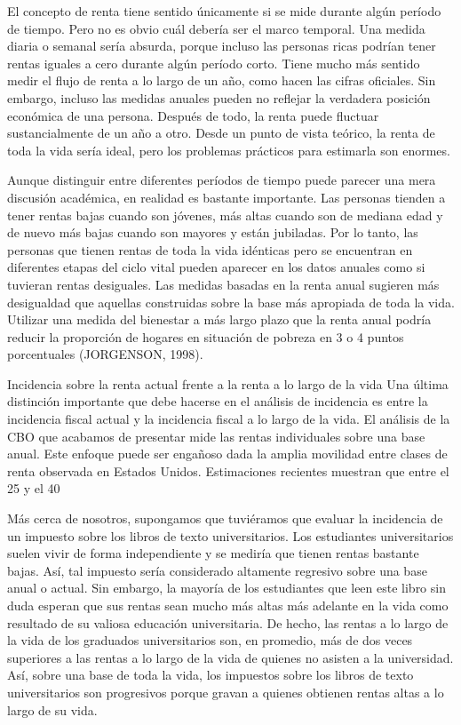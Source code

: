 \documentclass[10pt,a4paper]{article}
\begin{document}
{El concepto de renta tiene sentido únicamente si se mide durante algún período de tiempo. Pero no es obvio cuál debería ser el marco temporal. Una medida diaria o semanal sería absurda, porque incluso las personas ricas podrían tener rentas iguales a cero durante algún período corto. Tiene mucho más sentido medir el flujo de renta a lo largo de un año, como hacen las cifras oficiales. Sin embargo, incluso las medidas anuales pueden no reflejar la verdadera posición económica de una persona. Después de todo, la renta puede fluctuar sustancialmente de un año a otro. Desde un punto de vista teórico, la renta de toda la vida sería ideal, pero los problemas prácticos para estimarla son enormes.

Aunque distinguir entre diferentes períodos de tiempo puede parecer una mera discusión académica, en realidad es bastante importante. Las personas tienden a tener rentas bajas cuando son jóvenes, más altas cuando son de mediana edad y de nuevo más bajas cuando son mayores y están jubiladas. Por lo tanto, las personas que tienen rentas de toda la vida idénticas pero se encuentran en diferentes etapas del ciclo vital pueden aparecer en los datos anuales como si tuvieran rentas desiguales. Las medidas basadas en la renta anual sugieren más desigualdad que aquellas construidas sobre la base más apropiada de toda la vida. Utilizar una medida del bienestar a más largo plazo que la renta anual podría reducir la proporción de hogares en situación de pobreza en 3 o 4 puntos porcentuales (JORGENSON, 1998).

Incidencia sobre la renta actual frente a la renta a lo largo de la vida
Una última distinción importante que debe hacerse en el análisis de incidencia es entre la incidencia fiscal actual y la incidencia fiscal a lo largo de la vida. El análisis de la CBO que acabamos de presentar mide las rentas individuales sobre una base anual. Este enfoque puede ser engañoso dada la amplia movilidad entre clases de renta observada en Estados Unidos. Estimaciones recientes muestran que entre el 25 y el 40 %

Más cerca de nosotros, supongamos que tuviéramos que evaluar la incidencia de un impuesto sobre los libros de texto universitarios. Los estudiantes universitarios suelen vivir de forma independiente y se mediría que tienen rentas bastante bajas. Así, tal impuesto sería considerado altamente regresivo sobre una base anual o actual. Sin embargo, la mayoría de los estudiantes que leen este libro sin duda esperan que sus rentas sean mucho más altas más adelante en la vida como resultado de su valiosa educación universitaria. De hecho, las rentas a lo largo de la vida de los graduados universitarios son, en promedio, más de dos veces superiores a las rentas a lo largo de la vida de quienes no asisten a la universidad. Así, sobre una base de toda la vida, los impuestos sobre los libros de texto universitarios son progresivos porque gravan a quienes obtienen rentas altas a lo largo de su vida.

}
\end{document}
